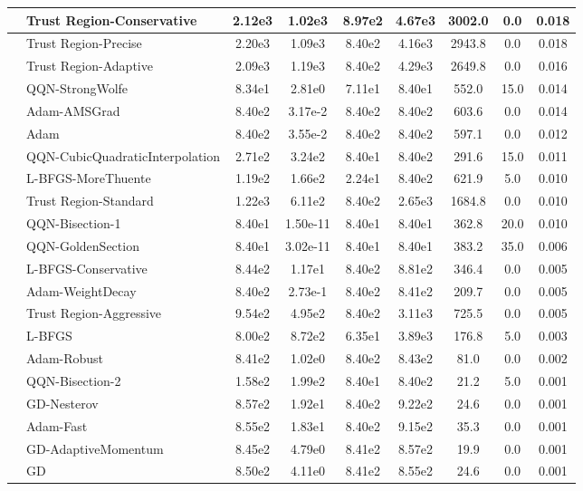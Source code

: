 \documentclass{article}
\begin{document}
\begin{longtable}{|l|l|c|c|c|c|c|c|c|}
\hline
 & Trust Region-Conservative & 2.12e3 & 1.02e3 & 8.97e2 & 4.67e3 & 3002.0 & 0.0 & 0.018 \\
\hline
 & Trust Region-Precise & 2.20e3 & 1.09e3 & 8.40e2 & 4.16e3 & 2943.8 & 0.0 & 0.018 \\
\hline
 & Trust Region-Adaptive & 2.09e3 & 1.19e3 & 8.40e2 & 4.29e3 & 2649.8 & 0.0 & 0.016 \\
\hline
 & QQN-StrongWolfe & 8.34e1 & 2.81e0 & 7.11e1 & 8.40e1 & 552.0 & 15.0 & 0.014 \\
\hline
 & Adam-AMSGrad & 8.40e2 & 3.17e-2 & 8.40e2 & 8.40e2 & 603.6 & 0.0 & 0.014 \\
\hline
 & Adam & 8.40e2 & 3.55e-2 & 8.40e2 & 8.40e2 & 597.1 & 0.0 & 0.012 \\
\hline
 & QQN-CubicQuadraticInterpolation & 2.71e2 & 3.24e2 & 8.40e1 & 8.40e2 & 291.6 & 15.0 & 0.011 \\
\hline
 & L-BFGS-MoreThuente & 1.19e2 & 1.66e2 & 2.24e1 & 8.40e2 & 621.9 & 5.0 & 0.010 \\
\hline
 & Trust Region-Standard & 1.22e3 & 6.11e2 & 8.40e2 & 2.65e3 & 1684.8 & 0.0 & 0.010 \\
\hline
 & QQN-Bisection-1 & 8.40e1 & 1.50e-11 & 8.40e1 & 8.40e1 & 362.8 & 20.0 & 0.010 \\
\hline
 & QQN-GoldenSection & 8.40e1 & 3.02e-11 & 8.40e1 & 8.40e1 & 383.2 & 35.0 & 0.006 \\
\hline
 & L-BFGS-Conservative & 8.44e2 & 1.17e1 & 8.40e2 & 8.81e2 & 346.4 & 0.0 & 0.005 \\
\hline
 & Adam-WeightDecay & 8.40e2 & 2.73e-1 & 8.40e2 & 8.41e2 & 209.7 & 0.0 & 0.005 \\
\hline
 & Trust Region-Aggressive & 9.54e2 & 4.95e2 & 8.40e2 & 3.11e3 & 725.5 & 0.0 & 0.005 \\
\hline
 & L-BFGS & 8.00e2 & 8.72e2 & 6.35e1 & 3.89e3 & 176.8 & 5.0 & 0.003 \\
\hline
 & Adam-Robust & 8.41e2 & 1.02e0 & 8.40e2 & 8.43e2 & 81.0 & 0.0 & 0.002 \\
\hline
 & QQN-Bisection-2 & 1.58e2 & 1.99e2 & 8.40e1 & 8.40e2 & 21.2 & 5.0 & 0.001 \\
\hline
 & GD-Nesterov & 8.57e2 & 1.92e1 & 8.40e2 & 9.22e2 & 24.6 & 0.0 & 0.001 \\
\hline
 & Adam-Fast & 8.55e2 & 1.83e1 & 8.40e2 & 9.15e2 & 35.3 & 0.0 & 0.001 \\
\hline
 & GD-AdaptiveMomentum & 8.45e2 & 4.79e0 & 8.41e2 & 8.57e2 & 19.9 & 0.0 & 0.001 \\
\hline
 & GD & 8.50e2 & 4.11e0 & 8.41e2 & 8.55e2 & 24.6 & 0.0 & 0.001 \\

\end{longtable}
\end{document}
